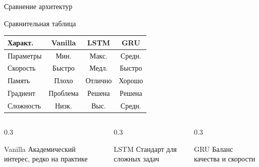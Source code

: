 \documentclass[aspectratio=169, 10pt]{beamer}
\begin{document}
\begin{frame}{Сравнение архитектур}
  \begin{block}{Сравнительная таблица}
    \centering
    \scriptsize
    \begin{tabular}{lccc}
      \toprule
      \textbf{Характ.} & \textbf{Vanilla} & \textbf{LSTM} & \textbf{GRU} \\
      \midrule
      Параметры & Мин. & Макс. & Средн. \\
      Скорость & Быстро & Медл. & Быстро \\
      Память & Плохо & Отлично & Хорошо \\
      Градиент & Проблема & Решена & Решена \\
      Сложность & Низк. & Выс. & Средн. \\
      \bottomrule
    \end{tabular}
  \end{block}
  
  \vspace{0.2cm}
  
  \begin{columns}[T]
    \begin{column}{0.3\textwidth}
      \begin{alertblock}{Vanilla}
        \scriptsize
        Академический интерес, редко на практике
      \end{alertblock}
    \end{column}
    
    \begin{column}{0.3\textwidth}
      \begin{block}{LSTM}
        \scriptsize
        Стандарт для сложных задач
      \end{block}
    \end{column}
    
    \begin{column}{0.3\textwidth}
      \begin{exampleblock}{GRU}
        \scriptsize
        Баланс качества и скорости
      \end{exampleblock}
    \end{column}
  \end{columns}
\end{frame}
\end{document}
